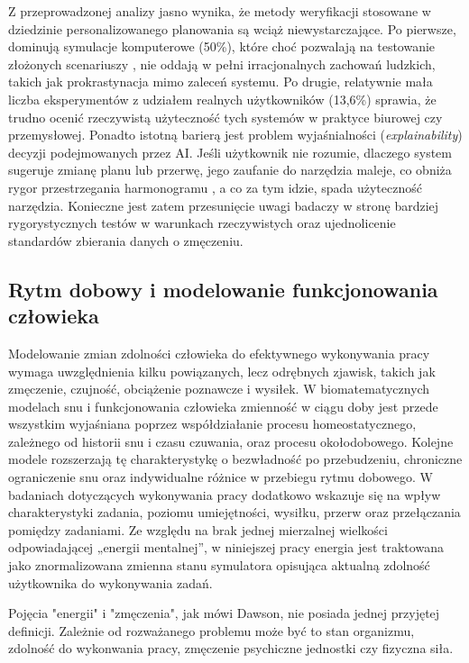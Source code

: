 \indent Z przeprowadzonej analizy jasno wynika, że metody weryfikacji stosowane w dziedzinie personalizowanego planowania są wciąż niewystarczające. Po pierwsze, dominują symulacje komputerowe (50\%), które choć pozwalają na testowanie złożonych scenariuszy \cite{endline2025}, nie oddają w pełni irracjonalnych zachowań ludzkich, takich jak prokrastynacja mimo zaleceń systemu. Po drugie, relatywnie mała liczba eksperymentów z udziałem realnych użytkowników (13,6\%) sprawia, że trudno ocenić rzeczywistą użyteczność tych systemów w praktyce biurowej czy przemysłowej. Ponadto istotną barierą jest problem wyjaśnialności (\textit{explainability}) decyzji podejmowanych przez AI. Jeśli użytkownik nie rozumie, dlaczego system sugeruje zmianę planu lub przerwę, jego zaufanie do narzędzia maleje, co obniża rygor przestrzegania harmonogramu \cite{exocortex2024}, a co za tym idzie, spada użyteczność narzędzia. Konieczne jest zatem przesunięcie uwagi badaczy w stronę bardziej rygorystycznych testów w warunkach rzeczywistych oraz ujednolicenie standardów zbierania danych o zmęczeniu.

\subsection{Rytm dobowy i modelowanie funkcjonowania człowieka}
\quad Modelowanie zmian zdolności człowieka do efektywnego wykonywania pracy wymaga uwzględnienia kilku powiązanych, lecz odrębnych zjawisk, takich jak zmęczenie, czujność, obciążenie poznawcze i wysiłek. W biomatematycznych modelach snu i funkcjonowania człowieka zmienność w ciągu doby jest przede wszystkim wyjaśniana poprzez współdziałanie procesu homeostatycznego, zależnego od historii snu i czasu czuwania, oraz procesu okołodobowego. Kolejne modele rozszerzają tę charakterystykę o bezwładność po przebudzeniu, chroniczne ograniczenie snu oraz indywidualne różnice w przebiegu rytmu dobowego. W badaniach dotyczących wykonywania pracy dodatkowo wskazuje się na wpływ charakterystyki zadania, poziomu umiejętności, wysiłku, przerw oraz przełączania pomiędzy zadaniami. Ze względu na brak jednej mierzalnej wielkości odpowiadającej „energii mentalnej”, w niniejszej pracy energia jest traktowana jako znormalizowana zmienna stanu symulatora opisująca aktualną zdolność użytkownika do wykonywania zadań.

\indent Pojęcia "energii" i "zmęczenia", jak mówi Dawson, nie posiada jednej przyjętej definicji. Zależnie od rozważanego problemu może być to stan organizmu, zdolność do wykonwania pracy, zmęczenie psychiczne jednostki czy fizyczna siła. 

